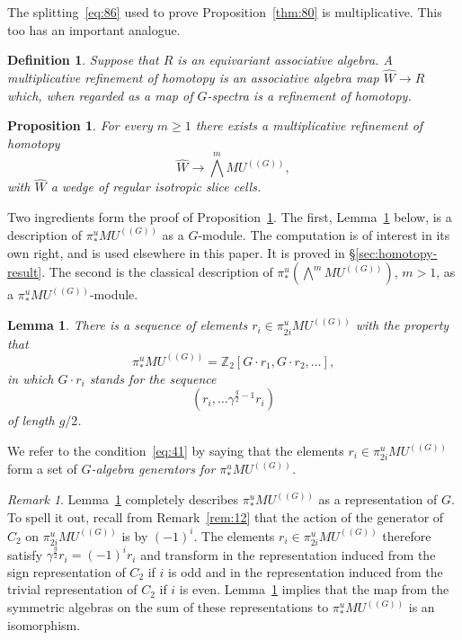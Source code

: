\documentclass{amsart}
\newtheorem{lem}[equation]{Lemma}
\newtheorem{prop}[equation]{Proposition}
\newtheorem{definition}[equation]{Definition}
\newenvironment{defin}{\begin{definition}\rm}{\end{definition}}
\newtheorem{rem}[equation]{Remark}
\theoremstyle{definition}
\newtheorem{defin}[equation]{Definition}
\theoremstyle{remark}
\newtheorem{rem}[equation]{Remark}
\newcommand{\Z}{{\mathbb Z}}
\newcommand{\mutn}[1]{MU^{(\!(#1)\!)}}
\newcommand{\piu}{\pi^{u}}
\newcommand{\zt}{C_{2}}
\newcommand{\refine}{\widehat{W}}
\begin{document}
The splitting~\eqref{eq:86} used to prove Proposition~\ref{thm:80} is
multiplicative.  This too has an important analogue.

\begin{defin}
\label{def:14}
Suppose that $R$ is an equivariant associative algebra.  A {\em
multiplicative refinement of homotopy} is an associative algebra map
$\refine\to R$ which, when regarded as a map of $G$-spectra is a refinement
of homotopy.
\end{defin}


\begin{prop}%
\label{thm:126}%
For every $m\ge 1$ there exists a multiplicative refinement of homotopy
\[
\refine\to \bigwedge^{m}\mutn{G},
\]
with $\refine$ a wedge of regular isotropic slice cells.
\end{prop}

Two ingredients form the proof of Proposition~\ref{thm:126}.  The
first, Lemma~\ref{thm:127} below, is a description of
$\piu_{\ast}\mutn{G}$ as a $G$-module.  The computation is of interest
in its own right, and is used elsewhere in this paper.  It is proved
in \S\ref{sec:homotopy-result}.  The second is the classical
description of $\piu_{\ast}(\bigwedge^{m}\mutn{G})$, $m>1$, as a
$\piu_{\ast}\mutn{G}$-module.

\begin{lem}
\label{thm:127}
There is a sequence of elements $r_{i}\in \piu_{2i}\mutn{G}$ with the
property that
\begin{equation}
\label{eq:41}
\piu_{\ast}\mutn{G} = \Z_{{2}}[G\cdot r_{1}, G\cdot r_{2},\dots],
\end{equation}
in which $G\cdot r_{i}$ stands for the sequence
\[
(r_{i},\dots \gamma^{\frac{g}{2}-1}r_{i})
\]
of length $g/2$.
\end{lem}

We refer to the condition~\eqref{eq:41} by saying that the elements
$r_{i}\in \piu_{2i}\mutn{G}$ form a set of {\em $G$-algebra generators
for $\piu_{\ast}\mutn{G}$.}

\begin{rem}
\label{rem:35} Lemma~\ref{thm:127} completely describes
$\piu_{\ast}\mutn{G}$ as a representation of $G$.  To spell it out,
recall from Remark~\ref{rem:12} that the action of the generator of
$\zt$ on $\piu_{2i}\mutn{G}$ is by $(-1)^{i}$.  The elements
$r_{i}\in\piu_{2i}\mutn{G}$ therefore satisfy
$\gamma^{\frac{g}{2}}r_{i}=(-1)^{i}r_{i}$ and transform in the
representation induced from the sign representation of $\zt$ if $i$ is
odd and in the representation induced from the trivial representation
of $\zt$ if $i$ is even.  Lemma~\ref{thm:127} implies that the map
from the symmetric algebras on the sum of these representations to
$\piu_{\ast}\mutn{G}$ is an isomorphism.
\end{rem}
\end{document}
